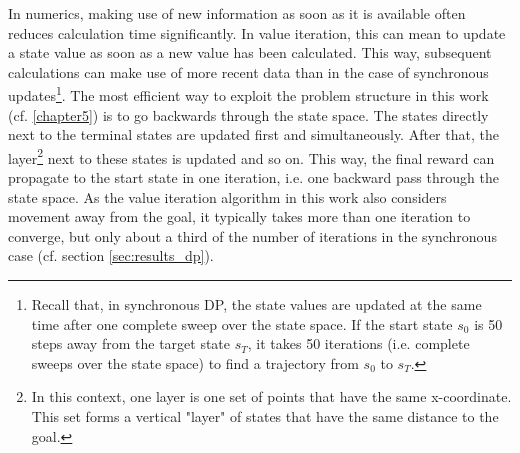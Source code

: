 In numerics, making use of new information as soon as it is available often reduces calculation time significantly. In value iteration, this can mean to update a state value as soon as a new value has been calculated. This way, subsequent calculations can make use of more recent data than in the case of synchronous updates\footnote{Recall that, in synchronous DP, the state values are updated at the same time after one complete sweep over the state space. If the start state $s_0$ is 50 steps away from the target state $s_T$, it takes 50 iterations (i.e. complete sweeps over the state space) to find a trajectory from $s_0$ to $s_T$.}. The most efficient way to exploit the problem structure in this work (cf. \ref{chapter5}) is to go backwards through the state space. The states directly next to the terminal states are updated first and simultaneously. After that, the layer\footnote{In this context, one layer is one set of points that have the same x-coordinate. This set forms a vertical "layer" of states that have the same distance to the goal.} next to these states is updated and so on. This way, the final reward can propagate to the start state in one iteration, i.e. one backward pass through the state space. As the value iteration algorithm in this work also considers movement away from the goal, it typically takes more than one iteration to converge, but only about a third of the number of iterations in the synchronous case (cf. section \ref{sec:results_dp}).